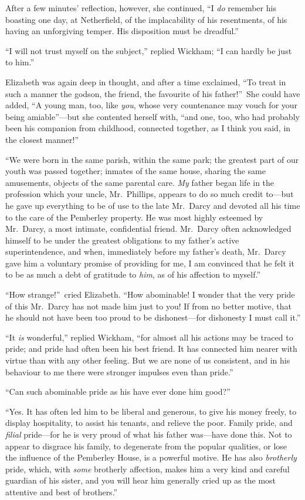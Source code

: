 \documentclass[12pt,english,oneside]{book}
\begin{document}
After a few minutes' reflection, however, she continued, {}``I \textit{do}
remember his boasting one day, at Netherfield, of the implacability
of his resentments, of his having an unforgiving temper. His disposition
must be dreadful.''

{}``I will not trust myself on the subject,'' replied Wickham; {}``I
can hardly be just to him.''

Elizabeth was again deep in thought, and after a time exclaimed, {}``To
treat in such a manner the godson, the friend, the favourite of his
father!''\ She could have added, {}``A young man, too, like \textit{you},
whose very countenance may vouch for your being amiable''---but she
contented herself with, {}``and one, too, who had probably been his
companion from childhood, connected together, as I think you said,
in the closest manner!''

{}``We were born in the same parish, within the same park; the greatest
part of our youth was passed together; inmates of the same house,
sharing the same amusements, objects of the same parental care. \textit{My}
father began life in the profession which your uncle, Mr.\ Phillips,
appears to do so much credit to\mbox{---}but he gave up everything
to be of use to the late Mr.\ Darcy and devoted all his time to the
care of the Pemberley property. He was most highly esteemed by Mr.\ Darcy,
a most intimate, confidential friend. Mr.\ Darcy often acknowledged
himself to be under the greatest obligations to my father's active
superintendence, and when, immediately before my father's death, Mr.\ Darcy
gave him a voluntary promise of providing for me, I am convinced that
he felt it to be as much a debt of gratitude to \textit{him}, as of
his affection to myself.''

{}``How strange!''\ cried Elizabeth. {}``How abominable! I wonder
that the very pride of this Mr.\ Darcy has not made him just to you!
If from no better motive, that he should not have been too proud to
be dishonest\mbox{---}for dishonesty I must call it.''

{}``It \textit{is} wonderful,'' replied Wickham, {}``for almost
all his actions may be traced to pride; and pride had often been his
best friend. It has connected him nearer with virtue than with any
other feeling. But we are none of us consistent, and in his behaviour
to me there were stronger impulses even than pride.''

{}``Can such abominable pride as his have ever done him good?''\ 

{}``Yes. It has often led him to be liberal and generous, to give
his money freely, to display hospitality, to assist his tenants, and
relieve the poor. Family pride, and \textit{filial} pride\mbox{---}for
he is very proud of what his father was\mbox{---}have done this.
Not to appear to disgrace his family, to degenerate from the popular
qualities, or lose the influence of the Pemberley House, is a powerful
motive. He has also \textit{brotherly} pride, which, with \textit{some}
brotherly affection, makes him a very kind and careful guardian of
his sister, and you will hear him generally cried up as the most attentive
and best of brothers.''
\end{document}
